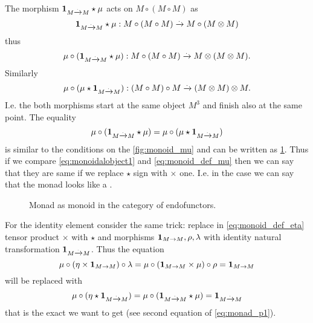The morphism $\mathbf{1}_{ M \xrightarrow{.} M } \star \mu$ acts on $M \circ ( M \circ M )$ as
\[
\mathbf{1}_{ M \xrightarrow{.} M } \star \mu : M \circ ( M \circ M ) \xrightarrow{.} M \circ (M \otimes M)
\]
thus
\[
\mu \circ (\mathbf{1}_{ M \xrightarrow{.} M } \star \mu) : M \circ ( M \circ M ) \xrightarrow{.} M \otimes (M \otimes M).
\]
Similarly 
\[
\mu \circ (\mu \star \mathbf{1}_{ M \xrightarrow{.} M }) : (M \circ  M) \circ M  \xrightarrow{.} ( M \otimes M) \otimes M.
\]
I.e. the both morphisms start at the same object $M^3$ and finish also
at the same point. The equality 
\begin{equation}
\mu \circ (\mathbf{1}_{ M \xrightarrow{.} M } \star \mu) = 
\mu \circ (\mu \star \mathbf{1}_{ M \xrightarrow{.} M })
\label{eq:monoidalobject1}
\end{equation}
is similar to the conditions on the \cref{fig:monoid_mu} and can be
written as \cref{fig:monad_monoid1}. Thus if we compare
\eqref{eq:monoidalobject1} and \eqref{eq:monoid_def_mu} then we can say
that they are same if we replace $\star$ sign with $\times$ one. I.e.
in the case we can say that the monad looks like a
. 

\begin{figure}
  \centering
  \caption{Monad as monoid in the category of endofunctors.}
  \label{fig:monad_monoid1}
\end{figure}

For the identity element consider the same trick: replace in
\eqref{eq:monoid_def_eta} tensor
product $\times$ with  $\star$ and
morphisms $\mathbf{1}_{ M \to M }, \rho, \lambda$ with identity natural transformation
$\mathbf{1}_{ M \xrightarrow{.} M }$. Thus the equation
\[
\mu \circ (\eta \times \mathbf{1}_{ M \to M })
\circ \lambda = \mu \circ (\mathbf{1}_{ M \to M } \times \mu) \circ \rho =
\mathbf{1}_{ M \to M }
\]
will be replaced with
\[
\mu \circ (\eta \star \mathbf{1}_{ M \xrightarrow{.} M }) = \mu \circ (\mathbf{1}_{ M \xrightarrow{.} M } \star \mu) =
\mathbf{1}_{ M \xrightarrow{.} M }
\]
that is the exact we want to get (see second equation of
\eqref{eq:monad_p1}). 

